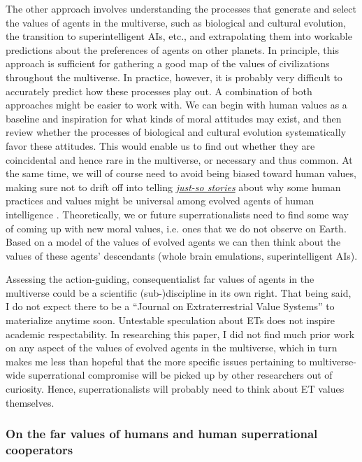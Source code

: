 The other approach involves understanding the processes that generate
and select the values of agents in the multiverse, such as biological
and cultural evolution, the transition to superintelligent AIs, etc.,
and extrapolating them into workable predictions about the preferences
of agents on other planets. In principle, this approach is sufficient
for gathering a good map of the values of civilizations throughout the
multiverse. In practice, however, it is probably very difficult to
accurately predict how these processes play out. A combination of both
approaches might be easier to work with. We can begin with human values
as a baseline and inspiration for what kinds of moral attitudes may
exist, and then review whether the processes of biological and cultural
evolution systematically favor these attitudes. This would enable us to
find out whether they are coincidental and hence rare in the multiverse,
or necessary and thus common. At the same time, we will of course need
to avoid being biased toward human values, making sure not to drift off
into telling
\href{https://en.wikipedia.org/wiki/Just-so_story}{\emph{just-so
stories}} about why some human practices and values might be universal
among evolved agents of human intelligence
\parencite{Buss2015-kp}. Theoretically, we or future
superrationalists need to find some way of coming up with new moral
values, i.e. ones that we do not observe on Earth. Based on a model of
the values of evolved agents we can then think about the values of these
agents' descendants (whole brain emulations, superintelligent AIs).

Assessing the action-guiding, consequentialist far values of agents in
the multiverse could be a scientific (sub-)discipline in its own right.
That being said, I do not expect there to be a ``Journal on
Extraterrestrial Value Systems'' to materialize anytime soon. Untestable
speculation about ETs does not inspire academic respectability. In
researching this paper, I did not find much prior work on any aspect of
the values of evolved agents in the multiverse, which in turn makes me
less than hopeful that the more specific issues pertaining to
multiverse-wide superrational compromise will be picked up by other
researchers out of curiosity. Hence, superrationalists will probably
need to think about ET values themselves.

\subsubsection{On the far values of humans and human superrational
cooperators}\label{on-the-far-values-of-humans-and-human-superrational-cooperators}

